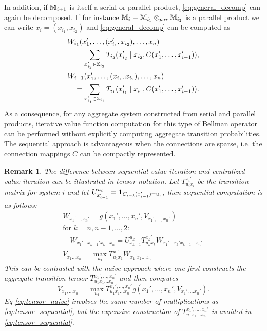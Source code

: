 \documentclass[conference]{IEEEtran}
\newtheorem{remark}{Remark}
\begin{document}
In addition, if $\mathbb{M}_{i+1}$ is itself a serial or parallel product, \eqref{eq:general_decomp} can again be decomposed. If for instance $\mathbb{M}_{i} = \mathbb{M}_{i_1} \otimes_{par} \mathbb{M}_{i_2}$ is a parallel product we can write $x_i = (x_{i_1}, x_{i_2})$ and \eqref{eq:general_decomp} can be computed as
\begin{equation}
\begin{aligned}
  & W_{i_1}(x_1', \ldots, (x_{i_1}', x_{i_2}), \ldots, x_n) \\
  & \quad = \sum_{x_{i_2}' \in \mathbb{X}_{i_2}} T_{i_2}(x_{i_2}' \mid x_{i_2}, C(x_1', \ldots, x_{i-1}') ), \\
  & W_{i-1}(x_1', \ldots, (x_{i_1}, x_{i_2}), \ldots, x_n) \\
  & \quad = \sum_{x_{i_1}' \in \mathbb{X}_{i_1}} T_{i_1}(x_{i_1}' \mid x_{i_1}, C(x_1', \ldots, x_{i-1}') ). \\
\end{aligned}
\end{equation}
As a consequence, for any aggregate system constructed from serial and parallel products, iterative value function computation for this type of Bellman operator can be performed without explicitly computing aggregate transition probabilities. The sequential approach is advantageous when the connections are sparse, i.e. the connection mappings $C$ can be compactly represented.

\begin{remark}
  The difference between sequential value iteration and centralized value iteration can be illustrated in tensor notation. Let $T_{u_i x_i}^{x_i'}$ be the transition matrix for system $i$ and let $U_{x'_{i-1}}^{u_i} = \mathbf{1}_{C_{i-1}(x'_{i-1}) = u_i}$, then sequential computation is as follows:
  \begin{equation}
  \label{eq:tensor_sequential}
  \begin{aligned}
      & W_{x_1' \ldots, x_n'} = g(x_1', \ldots, x_n', V_{x_1', \ldots, x_n'}) \\
      & \text{for $k = n, n-1, \ldots, 2$}: \\
      & \quad W_{x_1'\ldots x_{k-1}' x_{k} \ldots x_n} = U_{x_{k-1}}^{u_k} T_{u_k x_k}^{x_k'}  W_{x_1'\ldots x_k' x_{k+1} \ldots x_n'} \quad \\
      & V_{x_1\ldots x_n} = \max_{u_1} T^{x_1'}_{u_1x_1} W_{x_1' x_2 \ldots x_n}
  \end{aligned}
  \end{equation}
  This can be contrasted with the naive approach where one first constructs the aggregate transition tensor $T_{u_1 x_1 \ldots x_n}^{x_1', \ldots, x_n'}$ and then computes
  \begin{equation}
  \label{eq:tensor_naive}
    V_{x_1, \ldots x_n} = \max_{u_1} T_{u_1 x_1 \ldots x_n}^{x_1', \ldots, x_n'} g(x_1', \ldots, x_n', V_{x_1', \ldots x_n'}).
  \end{equation}
  Eq \eqref{eq:tensor_naive} involves the same number of multiplications as \eqref{eq:tensor_sequential}, but the expensive construction of $T_{u_1 x_1 \ldots x_n}^{x_1', \ldots, x_n'}$ is avoided in \eqref{eq:tensor_sequential}.
\end{remark}
\end{document}
